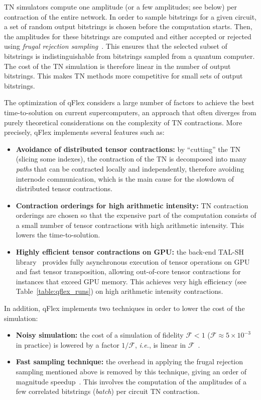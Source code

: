 TN simulators compute one amplitude (or a few amplitudes; see below) per contraction of the entire network. In order to sample bitstrings for a given circuit, a set of random output bitstrings is chosen before the computation starts. Then, the amplitudes for these bitstrings are computed and either accepted or rejected using
\emph{frugal rejection sampling}~\cite{markov_quantum_2018}. This ensures that the selected subset of bitstrings is indistinguishable from bitstrings sampled from a quantum computer. The cost of the TN simulation is therefore linear in the number of output bitstrings. This makes TN methods more competitive for small sets of output bitstrings.

The optimization of qFlex considers a large number of factors
to achieve the best time-to-solution on current supercomputers, an approach that often
diverges from purely theoretical considerations on the complexity of TN contractions.
More precisely, qFlex implements several features such as:
\begin{itemize}
    \item \textbf{Avoidance of distributed tensor contractions:} by ``cutting'' the TN (slicing some indexes), the contraction of the TN is decomposed into many \emph{paths} that can be contracted locally and independently, therefore avoiding internode communication, which is the main cause for the slowdown of distributed tensor contractions.
    \item \textbf{Contraction orderings for high arithmetic intensity:} TN contraction orderings are chosen so that the expensive part of the computation consists of a small number of tensor contractions with high arithmetic intensity. This lowers the time-to-solution.
    \item \textbf{Highly efficient tensor contractions on GPU:} the back-end TAL-SH library~\cite{lyakh_tal_sh} provides fully asynchronous execution of tensor operations on GPU and fast tensor transposition, allowing out-of-core tensor contractions for instances that exceed GPU memory. This achieves very high efficiency (see Table~\ref{table:qflex_runs}) on high arithmetic intensity contractions.
\end{itemize}

In addition, qFlex implements two techniques in order to lower the cost of the simulation:
\begin{itemize}
    \item \textbf{Noisy simulation:} the cost of a simulation of fidelity $\mathcal{F}<1$ ($\mathcal{F}\approx 5\times10^{-3}$ in practice) is lowered by a factor
    $1/\mathcal{F}$, \emph{i.e.}, is linear in $\mathcal{F}$~\cite{markov_quantum_2018,villalonga2019flexible}.
    \item \textbf{Fast sampling technique:} the overhead in applying the frugal rejection sampling mentioned above is removed by this technique, giving an order of magnitude speedup~\cite{villalonga2019flexible}. This involves the computation of the amplitudes of a few correlated bitstrings (\emph{batch}) per circuit TN contraction.
\end{itemize}


